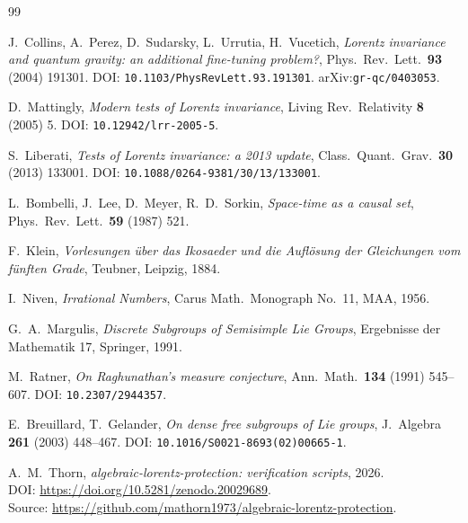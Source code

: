 \documentclass[11pt]{article}
\theoremstyle{remark}
\begin{document}
\begin{thebibliography}{99}

J.~Collins, A.~Perez, D.~Sudarsky, L.~Urrutia, H.~Vucetich,
\emph{Lorentz invariance and quantum gravity: an additional
fine-tuning problem?},
Phys.\ Rev.\ Lett.\ \textbf{93} (2004) 191301.
DOI: \texttt{10.1103/PhysRevLett.93.191301}.
arXiv:\texttt{gr-qc/0403053}.

D.~Mattingly,
\emph{Modern tests of Lorentz invariance},
Living Rev.\ Relativity \textbf{8} (2005) 5.
DOI: \texttt{10.12942/lrr-2005-5}.

S.~Liberati,
\emph{Tests of Lorentz invariance: a 2013 update},
Class.\ Quant.\ Grav.\ \textbf{30} (2013) 133001.
DOI: \texttt{10.1088/0264-9381/30/13/133001}.

L.~Bombelli, J.~Lee, D.~Meyer, R.~D.~Sorkin,
\emph{Space-time as a causal set},
Phys.\ Rev.\ Lett.\ \textbf{59} (1987) 521.

F.~Klein,
\emph{Vorlesungen \"uber das Ikosaeder und die Aufl\"osung der
Gleichungen vom f\"unften Grade},
Teubner, Leipzig, 1884.

I.~Niven,
\emph{Irrational Numbers},
Carus Math.\ Monograph No.\ 11, MAA, 1956.

G.~A.~Margulis,
\emph{Discrete Subgroups of Semisimple Lie Groups},
Ergebnisse der Mathematik 17, Springer, 1991.

M.~Ratner,
\emph{On Raghunathan's measure conjecture},
Ann.\ Math.\ \textbf{134} (1991) 545--607.
DOI: \texttt{10.2307/2944357}.

E.~Breuillard, T.~Gelander,
\emph{On dense free subgroups of Lie groups},
J.\ Algebra \textbf{261} (2003) 448--467.
DOI: \texttt{10.1016/S0021-8693(02)00665-1}.

A.~M.~Thorn,
\emph{algebraic-lorentz-protection: verification scripts}, 2026.\\
DOI: \url{https://doi.org/10.5281/zenodo.20029689}.\\
Source: \url{https://github.com/mathorn1973/algebraic-lorentz-protection}.

\end{thebibliography}
\end{document}
